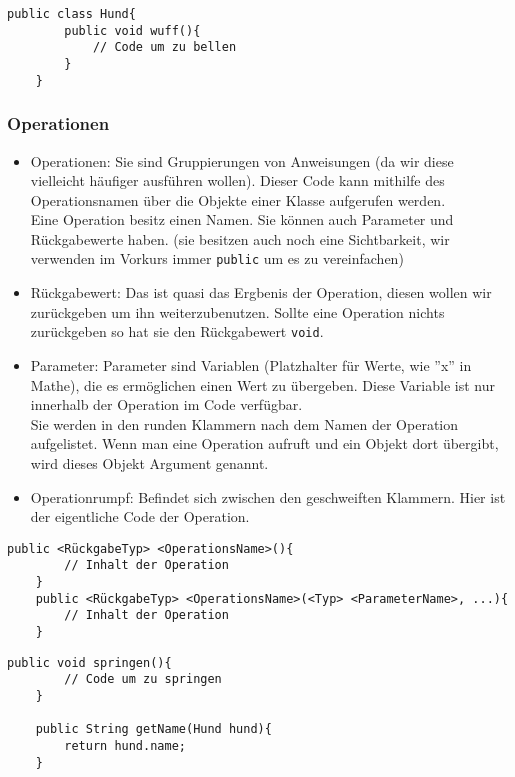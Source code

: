 \begin{lstlisting}[title=\textbf{Klassen Beispiel}]
	public class Hund{
		public void wuff(){
			// Code um zu bellen
		}
	}
\end{lstlisting}
\begin{Infobox}
	\subsubsection*{Operationen}
	\begin{itemize}
		\item Operationen: Sie sind Gruppierungen von Anweisungen (da wir diese vielleicht häufiger ausführen wollen).
			Dieser Code kann mithilfe des Operationsnamen über die Objekte einer Klasse aufgerufen werden.\\
			Eine Operation besitz einen Namen. Sie können auch Parameter und Rückgabewerte haben. (sie besitzen auch noch eine Sichtbarkeit, wir verwenden im Vorkurs immer \lstinline{public} um es zu vereinfachen)
		\item Rückgabewert: Das ist quasi das Ergbenis der Operation, diesen wollen wir zurückgeben um ihn weiterzubenutzen.
			Sollte eine Operation nichts zurückgeben so hat sie den Rückgabewert \lstinline{void}.
		\item Parameter: Parameter sind Variablen (Platzhalter für Werte, wie ''x'' in Mathe), die es ermöglichen einen Wert zu übergeben. Diese Variable ist nur innerhalb der Operation im Code verfügbar.\\
			Sie werden in den runden Klammern nach dem Namen der Operation aufgelistet.
			Wenn man eine Operation aufruft und ein Objekt dort übergibt, wird dieses Objekt Argument genannt.
		\item Operationrumpf: Befindet sich zwischen den geschweiften Klammern. Hier ist der eigentliche Code der Operation.
	\end{itemize}

\end{Infobox}

\begin{lstlisting}[title=\textbf{Operations Syntax}]
	public <RückgabeTyp> <OperationsName>(){
		// Inhalt der Operation
	}
	public <RückgabeTyp> <OperationsName>(<Typ> <ParameterName>, ...){
		// Inhalt der Operation
	}
\end{lstlisting}

\newpage

\begin{lstlisting}[title=\textbf{Operations Beispiel}]
	public void springen(){
		// Code um zu springen
	}
	
	public String getName(Hund hund){
		return hund.name;
	}
\end{lstlisting}

